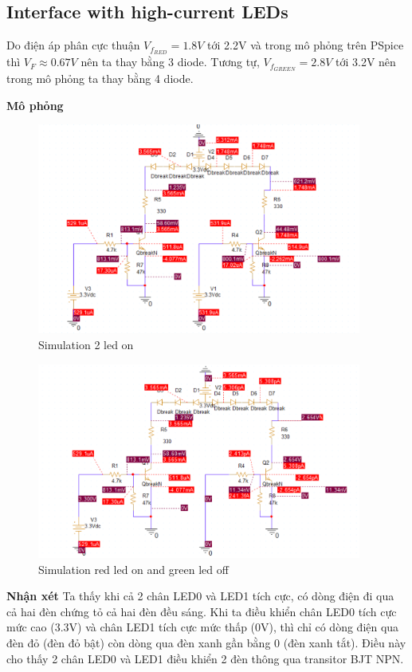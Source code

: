 \subsection{Interface with high-current LEDs}

Do điện áp phân cực thuận $V_{f_{RED}} = 1.8V$ tới 2.2V và trong mô phỏng trên PSpice thì $V_F \approx 0.67 V$ nên ta thay bằng 3 diode.
Tương tự, $V_{f_{GREEN}} = 2.8V$ tới 3.2V nên trong mô phỏng ta thay bằng 4 diode.

\pagebreak

\textbf{Mô phỏng}

\begin{figure}[ht]
    \centering
    \includegraphics[width=0.95\textwidth]{graphics/section4/f5.png}
    \caption{Simulation 2 led on}
\end{figure}

\begin{figure}[ht]
    \centering
    \includegraphics[width=0.95\textwidth]{graphics/section4/f6.png}
    \caption{Simulation red led on and green led off}
\end{figure}

\pagebreak

\textbf{Nhận xét} Ta thấy khi cả 2 chân LED0 và LED1 tích cực, có dòng điện đi qua cả hai đèn chứng tỏ cả hai đèn đều sáng. Khi ta điều khiển chân LED0 tích cực mức cao (3.3V) và chân LED1 tích cực mức thấp (0V), thì chỉ có dòng điện qua đèn đỏ (đèn đỏ bật) còn dòng qua đèn xanh gần bằng 0 (đèn xanh tắt). Điều này cho thấy 2 chân LED0 và LED1 điều khiển 2 đèn thông qua transitor BJT NPN.
